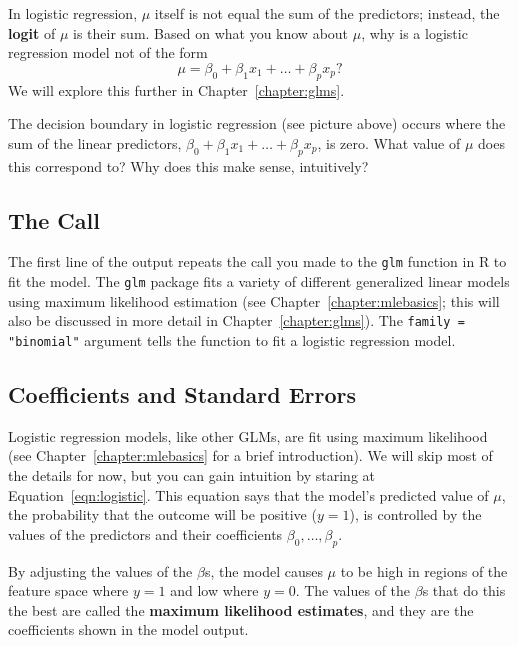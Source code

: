 \begin{question}{}
In logistic regression, $\mu$ itself is not equal the sum of the predictors; instead, the \textbf{logit} of $\mu$ is their sum. Based on what you know about $\mu$, why is a logistic regression model not of the form
$$ \mu = \beta_0 + \beta_1 x_1 + \dots + \beta_p x_p \text{?}$$
We will explore this further in Chapter~\ref{chapter:glms}.
\end{question}

\begin{question}{}
The decision boundary in logistic regression (see picture above) occurs where the sum of the linear predictors, $\beta_0 + \beta_1 x_1 + \dots + \beta_p x_p$, is zero. What value of $\mu$ does this correspond to? Why does this make sense, intuitively?
\end{question}

\subsection{The Call}

The first line of the output repeats the call you made to the \verb|glm| function in R to fit the model. The \texttt{glm} package fits a variety of different generalized linear models using maximum likelihood estimation (see Chapter~\ref{chapter:mlebasics}; this will also be discussed in more detail in Chapter~\ref{chapter:glms}). The \texttt{family = "binomial"} argument tells the function to fit a logistic regression model.

\subsection{Coefficients and Standard Errors}

Logistic regression models, like other GLMs, are fit using maximum likelihood (see Chapter~\ref{chapter:mlebasics} for a brief introduction). We will skip most of the details for now, but you can gain intuition by staring at Equation~\ref{eqn:logistic}. This equation says that the model's predicted value of $\mu$, the probability that the outcome will be positive ($y=1$), is controlled by the values of the predictors and their coefficients $\beta_0, \dots, \beta_p$. 

By adjusting the values of the $\beta$s, the model causes $\mu$ to be high in regions of the feature space where $y=1$ and low where $y=0$. The values of the $\beta$s that do this the best are called the \textbf{maximum likelihood estimates}, and they are the coefficients shown in the model output.

